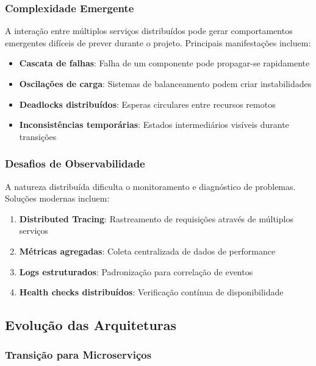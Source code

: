 \subsubsection{Complexidade Emergente}

A interação entre múltiplos serviços distribuídos pode gerar comportamentos emergentes difíceis de prever durante o projeto. Principais manifestações incluem:

\begin{itemize}
    \item \textbf{Cascata de falhas}: Falha de um componente pode propagar-se rapidamente
    \item \textbf{Oscilações de carga}: Sistemas de balanceamento podem criar instabilidades
    \item \textbf{Deadlocks distribuídos}: Esperas circulares entre recursos remotos
    \item \textbf{Inconsistências temporárias}: Estados intermediários visíveis durante transições
\end{itemize}

\subsubsection{Desafios de Observabilidade}

A natureza distribuída dificulta o monitoramento e diagnóstico de problemas. Soluções modernas incluem:

\begin{enumerate}
    \item \textbf{Distributed Tracing}: Rastreamento de requisições através de múltiplos serviços
    \item \textbf{Métricas agregadas}: Coleta centralizada de dados de performance
    \item \textbf{Logs estruturados}: Padronização para correlação de eventos
    \item \textbf{Health checks distribuídos}: Verificação contínua de disponibilidade
\end{enumerate}

\subsection{Evolução das Arquiteturas}

\subsubsection{Transição para Microserviços}

